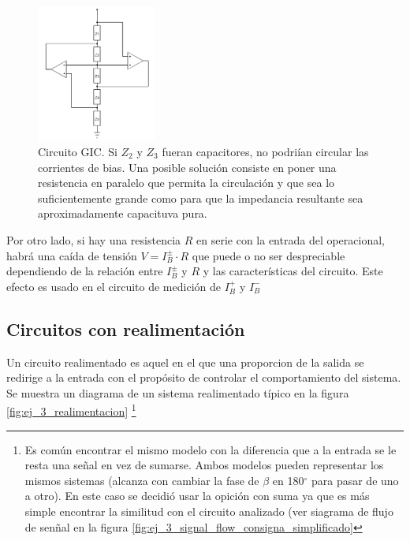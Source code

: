 \documentclass[../../main.tex]{subfiles}
\begin{document}
\begin{figure}[htb] %
	\centering
	\includegraphics[width=0.35\textwidth]{imagenes/gic.png}
	\caption[Capacitores en un GIC]{Circuito GIC. Si $Z_2$ y $Z_3$ fueran capacitores, no podri\'ian circular las corrientes de bias. Una posible soluci\'on consiste en poner una resistencia en paralelo que permita la circulaci\'on y que sea lo suficientemente grande como para que la impedancia resultante sea aproximadamente capacituva pura.}
	\label{fig:ej_3_GIC}
\end{figure}


Por otro lado, si hay una resistencia $R$ en serie con la entrada del operacional, habr\'a una ca\'ida de tensi\'on $V=I_B^\pm\cdot R$ que puede o no ser despreciable dependiendo de la relaci\'on entre $I_B^\pm$ y $R$ y las caracter\'isticas del circuito. Este efecto es usado en el circuito de medici\'on de $I_B^+$ y $I_B^-$








\subsection{Circuitos con realimentaci\'on}	\label{ssec:realimentacion}

Un circuito realimentado es aquel en el que una proporcion de la salida se redirige a la entrada con el prop\'osito de controlar el comportamiento del sistema. Se  muestra un diagrama de un sistema realimentado t\'ipico en la figura \ref{fig:ej_3_realimentacion}
\footnote{Es com\'un encontrar el mismo modelo con la diferencia que a la entrada se le resta una se\~nal en vez de sumarse. Ambos modelos pueden representar los mismos sistemas (alcanza con cambiar la fase de $\beta$ en 180$^\circ$ para pasar de uno a otro). En este caso se decidi\'o usar la opici\'on con suma ya que es m\'as simple encontrar la similitud con el circuito analizado (ver siagrama de flujo de sen\~nal en la figura \ref{fig:ej_3_signal_flow_consigna_simplificado}}
\end{document}
